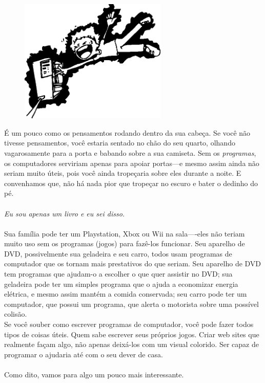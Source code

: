 \begin{figure}
  \begin{center}
\includegraphics*[width=70mm]{eps/electrocute.eps}
  \end{center}
\end{figure}

É um pouco como os pensamentos rodando dentro da sua cabeça. Se você não tivesse pensamentos, você estaria sentado no chão do seu quarto, olhando vagarosamente para a porta e babando sobre a sua camiseta. Sem os \emph{programas}, os computadores serviriam apenas para apoiar portas---e mesmo assim ainda não seriam muito úteis, pois você ainda tropeçaria sobre eles durante a noite. E convenhamos que, não há nada pior que tropeçar no escuro e bater o dedinho do pé.
\\
\\
\emph{Eu sou apenas um livro e eu sei disso.}
\\
\\
Sua família pode ter um Playstation, Xbox ou Wii na sala----eles não teriam muito uso sem os programas (jogos) para fazê-los funcionar. Seu aparelho de DVD, possivelmente sua geladeira e seu carro, todos usam programas de computador que os tornam mais prestativos do que seriam. Seu aparelho de DVD tem programas que ajudam-o a escolher o que quer assistir no DVD; sua geladeira pode ter um simples programa que o ajuda a economizar energia elétrica, e mesmo assim mantém a comida conservada; seu carro pode ter um computador, que possui um programa, que alerta o motorista sobre uma possível colisão.\\
Se você souber como escrever programas de computador, você pode fazer todos tipos de coisas úteis. Quem sabe escrever seus próprios jogos. Criar web sites que realmente façam algo, não apenas deixá-los com um visual colorido. Ser capaz de programar o ajudaria até com o seu dever de casa.\\
\\
Como dito, vamos para algo um pouco mais interessante.

